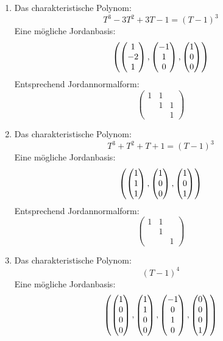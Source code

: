 \documentclass[a4paper, 10pt]{scrartcl}
\begin{document}
\begin{solution}
  \begin{enumerate}
    \item
      Das charakteristische Polynom:
      \[
        T^3 - 3 T^2 + 3T - 1 = (T - 1)^3
      \]
      Eine mögliche Jordanbasis:
      \[
        \left( \begin{pmatrix} 1 \\ -2 \\ 1 \end{pmatrix}, \begin{pmatrix} -1 \\ 1 \\ 0 \end{pmatrix}, \begin{pmatrix} 1 \\ 0 \\ 0 \end{pmatrix} \right)
      \]
      Entsprechend Jordannormalform:
      \[
        \begin{pmatrix}
          1 & 1 &   \\
            & 1 & 1 \\
            &   & 1
        \end{pmatrix}
      \]
    \item
      Das charakteristische Polynom:
      \[
        T^3 + T^2 + T + 1 = (T - 1)^3
      \]
      Eine mögliche Jordanbasis:
      \[
        \left( \begin{pmatrix} 1 \\ 1  \\ 1 \end{pmatrix}, \begin{pmatrix} 1 \\ 0 \\ 0 \end{pmatrix}, \begin{pmatrix} 1 \\ 0 \\ 1 \end{pmatrix} \right)
      \]
      Entsprechend Jordannormalform:
      \[
        \begin{pmatrix}
          1 & 1 &   \\
            & 1 &   \\
            &   & 1
        \end{pmatrix}
      \]
    \item
      Das charakteristische Polynom:
      \[
        (T - 1)^4
      \]
      Eine mögliche Jordanbasis:
      \[
        \left( \begin{pmatrix} 1 \\ 0 \\ 0 \\ 0 \end{pmatrix}, \begin{pmatrix} 1 \\ 1 \\ 0 \\ 0 \end{pmatrix}, \begin{pmatrix} -1 \\ 0 \\ 1 \\ 0 \end{pmatrix}, \begin{pmatrix} 0 \\ 0 \\ 0 \\ 1 \end{pmatrix} \right)
\]
\end{enumerate}
\end{solution}
\end{document}
